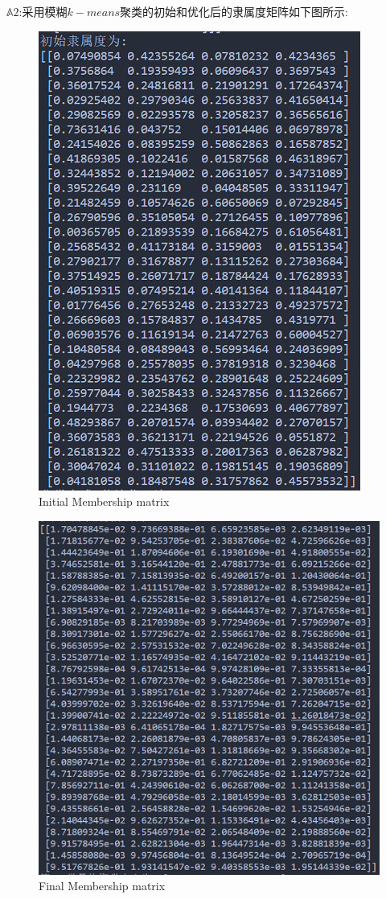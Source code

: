 \documentclass[homework]{IEEEtran}
\begin{document}
\begin{CJK}{UTF8}{gkai}
$\mathbb{A}2$:采用模糊$k-means$聚类的初始和优化后的隶属度矩阵如下图所示:
\begin{figure}[htb]
    \centerline{\includegraphics{Images/fig23.png}}
    \caption{Initial Membership matrix}
    \label{fig23}
    \end{figure} 

\newpage
\begin{figure}[htb]
    \centerline{\includegraphics{Images/fig24.png}}
    \caption{Final Membership matrix}
    \label{fig24}
    \end{figure} \par
\end{CJK}
\end{document}
